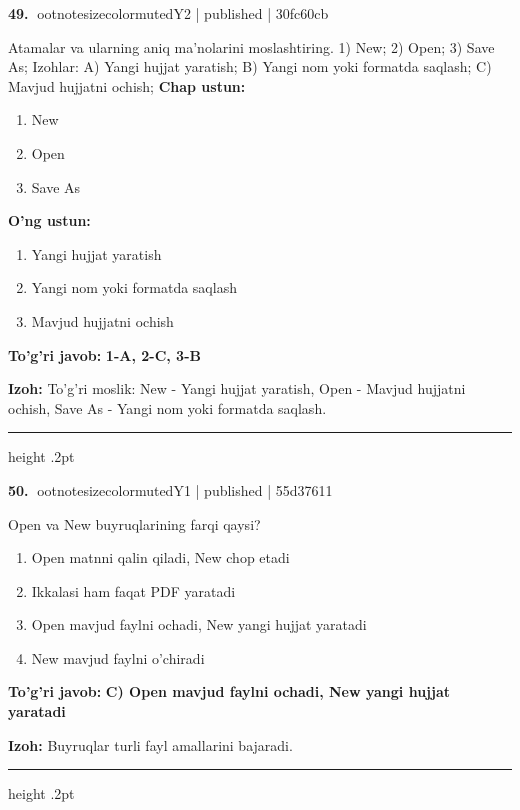\documentclass[10pt,a4paper]{article}
\begin{document}
\textbf{\color{ink}49.} {ootnotesizecolor{muted}Y2 | published | 30fc60cb}
\par
Atamalar va ularning aniq ma'nolarini moslashtiring.  1) New;  2) Open;  3) Save As;  Izohlar: A) Yangi hujjat yaratish;  B) Yangi nom yoki formatda saqlash;  C) Mavjud hujjatni ochish;
\textbf{Chap ustun:}\begin{enumerate}[label=\arabic*),leftmargin=9mm]
\item New
\item Open
\item Save As
\end{enumerate}
\textbf{O'ng ustun:}\begin{enumerate}[label=\Alph*),leftmargin=9mm]
\item Yangi hujjat yaratish
\item Yangi nom yoki formatda saqlash
\item Mavjud hujjatni ochish
\end{enumerate}
\begin{tcolorbox}[enhanced,breakable,colback=teal!4,colframe=teal!55!black,boxrule=0.45pt,arc=1.2mm,left=2.8mm,right=2.8mm,top=2mm,bottom=2mm]
\textbf{\color{teal}To'g'ri javob:} \textbf{1-A, 2-C, 3-B}
\par\smallskip
\textbf{Izoh:} To'g'ri moslik: New - Yangi hujjat yaratish, Open - Mavjud hujjatni ochish, Save As - Yangi nom yoki formatda saqlash.
\end{tcolorbox}
\vspace{2mm}\hrule height .2pt\vspace{2mm}

\textbf{\color{ink}50.} {ootnotesizecolor{muted}Y1 | published | 55d37611}
\par
Open va New buyruqlarining farqi qaysi?
\begin{enumerate}[label=\Alph*),leftmargin=9mm]
\item Open matnni qalin qiladi, New chop etadi
\item Ikkalasi ham faqat PDF yaratadi
\item Open mavjud faylni ochadi, New yangi hujjat yaratadi
\item New mavjud faylni o'chiradi
\end{enumerate}
\begin{tcolorbox}[enhanced,breakable,colback=teal!4,colframe=teal!55!black,boxrule=0.45pt,arc=1.2mm,left=2.8mm,right=2.8mm,top=2mm,bottom=2mm]
\textbf{\color{teal}To'g'ri javob:} \textbf{C) Open mavjud faylni ochadi, New yangi hujjat yaratadi}
\par\smallskip
\textbf{Izoh:} Buyruqlar turli fayl amallarini bajaradi.
\end{tcolorbox}
\vspace{2mm}\hrule height .2pt\vspace{2mm}
\end{document}
